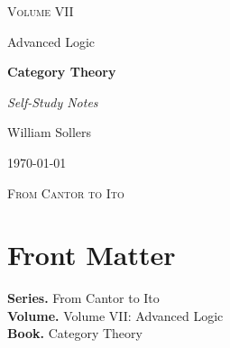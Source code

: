 \documentclass[12pt, a4paper]{report}
\begin{document}
\ExplSyntaxOff
\renewcommand{\familydefault}{\rmdefault}

\begin{titlepage}
\centering
\vspace*{3.5cm}

{\Large\scshape Volume VII\par}
\vspace{0.35cm}
{\large Advanced Logic\par}

\vspace{1.4cm}

{\Huge\bfseries Category Theory\par}

\vspace{0.6cm}
{\large\itshape Self-Study Notes\par}

\vfill

{\large William Sollers\par}
\vspace{0.35cm}
{\large \today\par}

\vfill

{\large\scshape From Cantor to Ito\par}
\end{titlepage}

\clearpage
\thispagestyle{plain}
\chapter*{Front Matter}
\noindent\textbf{Series.} From Cantor to Ito\\[0.5em]
\textbf{Volume.} Volume VII: Advanced Logic\\[0.5em]
\textbf{Book.} Category Theory

\clearpage
\tableofcontents
\clearpage
{}



\clearpage



\printindex[tech]
\printindex[dep]
\end{document}
